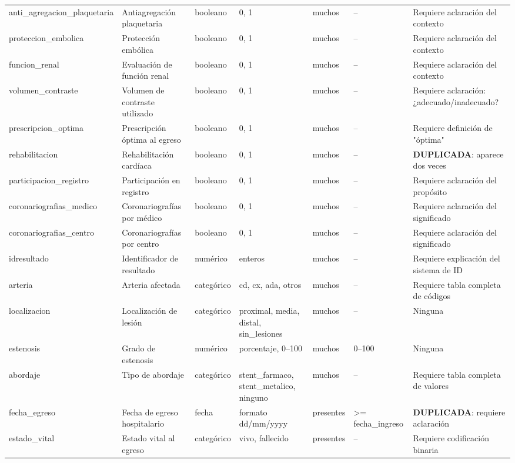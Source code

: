 \documentclass[11pt,a4paper]{article}
\begin{document}
\begin{longtable}{@{}L{0.095\textwidth} L{0.17\textwidth} L{0.07\textwidth} L{0.16\textwidth} L{0.14\textwidth} L{0.13\textwidth} L{0.15\textwidth}@{}}
anti\_agregacion\_plaquetaria & Antiagregación plaquetaria & booleano & 0, 1 & muchos & -- & Requiere aclaración del contexto \\
proteccion\_embolica & Protección embólica & booleano & 0, 1 & muchos & -- & Requiere aclaración del contexto \\
funcion\_renal & Evaluación de función renal & booleano & 0, 1 & muchos & -- & Requiere aclaración del contexto \\
volumen\_contraste & Volumen de contraste utilizado & booleano & 0, 1 & muchos & -- & Requiere aclaración: ¿adecuado/inadecuado? \\
prescripcion\_optima & Prescripción óptima al egreso & booleano & 0, 1 & muchos & -- & Requiere definición de "óptima" \\
rehabilitacion & Rehabilitación cardíaca & booleano & 0, 1 & muchos & -- & \textbf{DUPLICADA}: aparece dos veces \\
participacion\_registro & Participación en registro & booleano & 0, 1 & muchos & -- & Requiere aclaración del propósito \\
coronariografias\_medico & Coronariografías por médico & booleano & 0, 1 & muchos & -- & Requiere aclaración del significado \\
coronariografias\_centro & Coronariografías por centro & booleano & 0, 1 & muchos & -- & Requiere aclaración del significado \\
idresultado & Identificador de resultado & numérico & enteros & muchos & -- & Requiere explicación del sistema de ID \\
arteria & Arteria afectada & categórico & cd, cx, ada, otros & muchos & -- & Requiere tabla completa de códigos \\
localizacion & Localización de lesión & categórico & proximal, media, distal, sin\_lesiones & muchos & -- & Ninguna \\
estenosis & Grado de estenosis & numérico & porcentaje, 0--100 & muchos & 0--100 & Ninguna \\
abordaje & Tipo de abordaje & categórico & stent\_farmaco, stent\_metalico, ninguno & muchos & -- & Requiere tabla completa de valores \\
fecha\_egreso & Fecha de egreso hospitalario & fecha & formato dd/mm/yyyy & presentes & >= fecha\_ingreso & \textbf{DUPLICADA}: requiere aclaración \\
estado\_vital & Estado vital al egreso & categórico & vivo, fallecido & presentes & -- & Requiere codificación binaria \\

\end{longtable}
\end{document}
